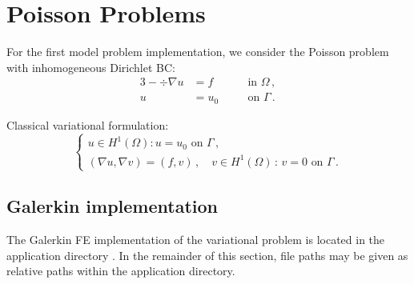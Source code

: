 %
%


\section{Poisson Problems}
\label{sec:poisson}

For the first model problem implementation, we consider the Poisson problem with inhomogeneous Dirichlet BC:
\begin{alignat*}{3}
	- \div \nabla u &= f && \quad \text{in } \Omega \, , \\
	u &= u_0 && \quad \text{on } \Gamma \, .
\end{alignat*}

Classical variational formulation:
\[
\left\{
\begin{array}{llll}
	u \in H^1(\Omega):  u = u_0 \text{ on } \Gamma \, , \\[5pt]
	(\nabla u, \nabla v) = (f,v) \, ,
	\quad v \in H^1(\Omega) \, : \, v = 0 \text{ on } \Gamma \, .
\end{array}
\right.
\]

\subsection{Galerkin implementation}
\label{subsec:poisson-galerkin}

The Galerkin FE implementation of the variational problem is located in the application directory . In the remainder of this section, file paths may be given as relative paths within the application directory.

